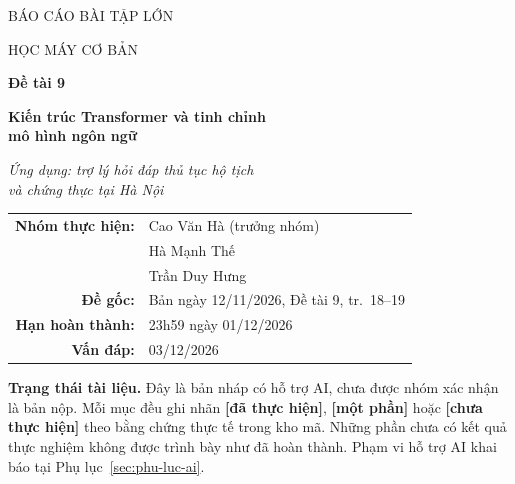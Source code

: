 \documentclass[11pt,a4paper]{article}
\newcommand{\dalam}{\textbf{[đã thực hiện]}}
\newcommand{\chualam}{\textbf{[chưa thực hiện]}}
\newcommand{\motphan}{\textbf{[một phần]}}
\begin{document}
\begin{titlepage}
\centering
\vspace*{18mm}

{\large BÁO CÁO BÀI TẬP LỚN\par}
{\large HỌC MÁY CƠ BẢN\par}

\vspace{20mm}
{\LARGE\bfseries Đề tài 9\par}
\vspace{4mm}
{\LARGE\bfseries Kiến trúc Transformer và tinh chỉnh\\[2mm] mô hình ngôn ngữ\par}

\vspace{8mm}
{\large\itshape Ứng dụng: trợ lý hỏi đáp thủ tục hộ tịch\\ và chứng thực tại Hà Nội\par}

\vspace{24mm}
\begin{tabular}{rl}
\textbf{Nhóm thực hiện:} & Cao Văn Hà (trưởng nhóm)\\
 & Hà Mạnh Thế\\
 & Trần Duy Hưng\\[4mm]
\textbf{Đề gốc:} & Bản ngày 12/11/2026, Đề tài 9, tr.~18--19\\[4mm]
\textbf{Hạn hoàn thành:} & 23h59 ngày 01/12/2026\\
\textbf{Vấn đáp:} & 03/12/2026\\
\end{tabular}

\vfill
\begin{minipage}{0.86\textwidth}
\small
\textbf{Trạng thái tài liệu.} Đây là bản nháp có hỗ trợ AI, chưa được nhóm xác nhận là
bản nộp. Mỗi mục đều ghi nhãn \dalam, \motphan{} hoặc \chualam{} theo bằng chứng
thực tế trong kho mã. Những phần chưa có kết quả thực nghiệm không được trình bày
như đã hoàn thành. Phạm vi hỗ trợ AI khai báo tại Phụ lục~\ref{sec:phu-luc-ai}.
\end{minipage}

\vspace{10mm}
\end{titlepage}

\tableofcontents
\clearpage

\clearpage
{}
\end{document}
